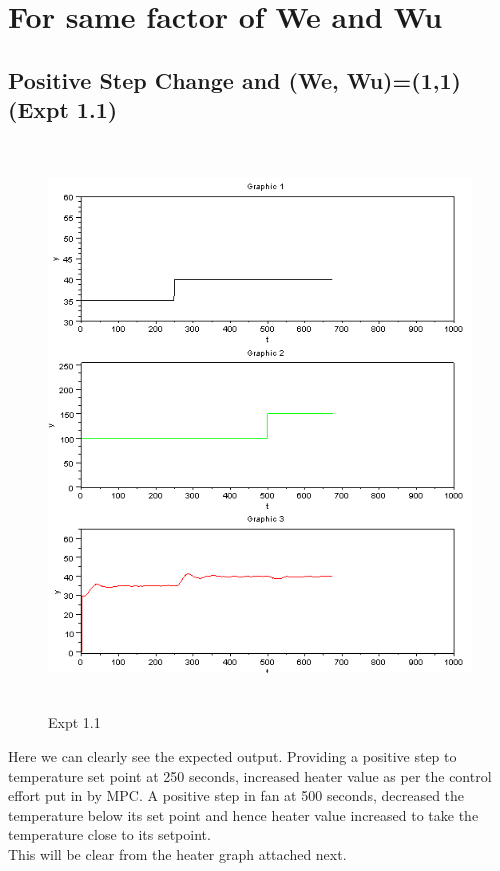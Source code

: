 \section{For same factor of We and Wu}
\subsection{Positive Step Change and (We, Wu)=(1,1) (Expt 1.1)}
\begin{figure}[H]
  \includegraphics[width=12cm, height=15cm]{mpc/1_1.png}
  \caption{Expt 1.1}
\end{figure}
Here we can clearly see the expected output. Providing a positive step to temperature set point at 250 seconds, increased heater value as per the control effort put in by MPC. A positive step in fan at 500 seconds, decreased the temperature below its set point and hence heater value increased to take the temperature close to its setpoint. \\
This will be clear from the heater graph attached next.
